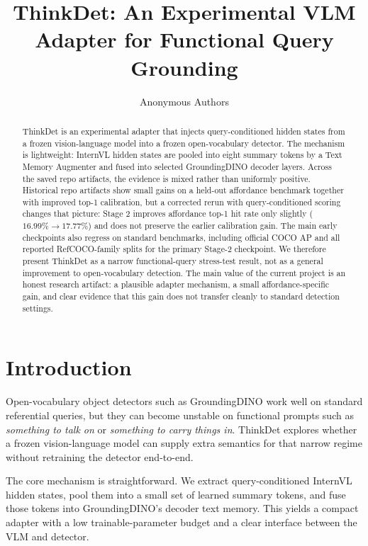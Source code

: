 \documentclass{uai2026} %
\title{ThinkDet: An Experimental VLM Adapter for Functional Query Grounding}
\author[1]{Anonymous Authors}
\affil[1]{Anonymous Institution}
\begin{document}
\maketitle

\begin{abstract}
ThinkDet is an experimental adapter that injects query-conditioned hidden states
from a frozen vision-language model into a frozen open-vocabulary detector.
The mechanism is lightweight: InternVL hidden states are pooled into eight
summary tokens by a Text Memory Augmenter and fused into selected
GroundingDINO decoder layers. Across the saved repo artifacts, the evidence is
mixed rather than uniformly positive. Historical repo artifacts show small
gains on a held-out affordance benchmark together with improved top-1
calibration, but a corrected rerun with query-conditioned scoring changes that
picture: Stage 2 improves affordance top-1 hit rate only slightly
(\(16.99\%\rightarrow17.77\%\)) and does not preserve the earlier calibration
gain. The main early checkpoints also regress on standard benchmarks,
including official COCO AP and all reported RefCOCO-family splits for the
primary Stage-2 checkpoint. We therefore present ThinkDet as a narrow
functional-query stress-test result, not as a general improvement to
open-vocabulary detection. The main value of the current project is an honest
research artifact: a plausible adapter mechanism, a small affordance-specific
gain, and clear evidence that this gain does not transfer cleanly to standard
detection settings.
\end{abstract}

\section{Introduction}\label{sec:intro}
Open-vocabulary object detectors such as GroundingDINO \citep{groundingdino2023}
work well on standard referential queries, but they can become unstable on
functional prompts such as \emph{something to talk on} or
\emph{something to carry things in}. ThinkDet explores whether a frozen
vision-language model can supply extra semantics for that narrow regime without
retraining the detector end-to-end.

The core mechanism is straightforward. We extract query-conditioned InternVL
hidden states, pool them into a small set of learned summary tokens, and fuse
those tokens into GroundingDINO's decoder text memory. This yields a compact
adapter with a low trainable-parameter budget and a clear interface between the
VLM and detector.
\end{document}
